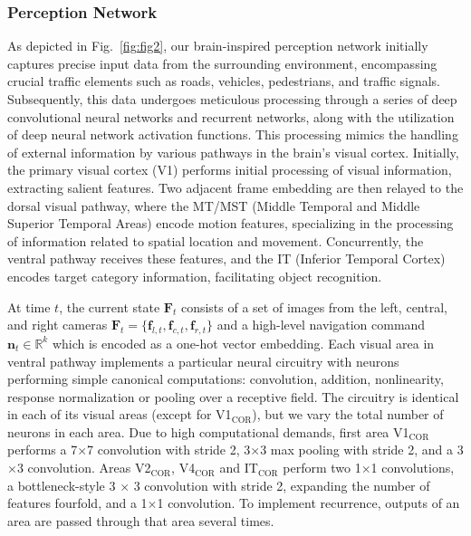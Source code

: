 \subsubsection{Perception Network}
\hspace{1pc}As depicted in Fig.~\ref{fig:fig2}, our brain-inspired perception network initially captures precise input data from the surrounding environment, encompassing crucial traffic elements such as roads, vehicles, pedestrians, and traffic signals. 
Subsequently, this data undergoes meticulous processing through a series of deep convolutional neural networks and recurrent networks, along with the utilization of deep neural network activation functions. 
This processing mimics the handling of external information by various pathways in the brain's visual cortex. 
Initially, the primary visual cortex (V1) performs initial processing of visual information, extracting salient features.
Two adjacent frame embedding are then relayed to the dorsal visual pathway, where the MT/MST (Middle Temporal and Middle Superior Temporal Areas) encode motion features, specializing in the processing of information related to spatial location and movement.
Concurrently, the ventral pathway receives these features, and the IT (Inferior Temporal Cortex) encodes target category information, facilitating object recognition. 


At time $t$, the current state $\mathbf{F}_t$ consists of a set of images from the left, central, and right cameras $\mathbf{F}_{t}=\{\mathbf{f}_{l,t}, \mathbf{f}_{c,t}, \mathbf{f}_{r,t} \}$ and a high-level navigation command $\mathbf{n}_t\in\mathbb{R}^{k}$ which is encoded as a one-hot vector embedding.
%
Each visual area in ventral pathway implements a particular neural circuitry with neurons performing simple canonical computations: convolution, addition, nonlinearity, response normalization or pooling over a receptive field. 
The circuitry is identical in each of its visual areas (except for V1$_\text{COR}$), but we vary the total number of neurons in each area.
Due to high computational demands, first area V1$_\text{COR}$ performs a 7$\times$7 convolution with stride 2, 3$\times$3 max pooling with stride 2, and a 3$\times$3 convolution. 
Areas V2$_\text{COR}$, V4$_\text{COR}$ and IT$_\text{COR}$ perform two 1$\times$1 convolutions, a bottleneck-style 3 $ \times $ 3 convolution with stride 2, expanding the number of features fourfold, and a 1$\times$1 convolution. 
To implement recurrence, outputs of an area are passed through that area several times. 


